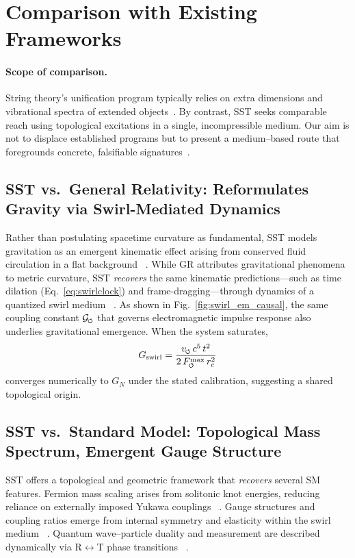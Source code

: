 \documentclass[10pt,reprint,aps,onecolumn,nofootinbib]{revtex4-2}
\newcommand{\Fmaxswirl}{F^{\max}_{\mkern-1mu\scriptscriptstyle\boldsymbol{\circlearrowleft}}}
\begin{document}
\section{Comparison with Existing Frameworks}\label{sec:comparison}

    \paragraph*{Scope of comparison.}
        String theory’s unification program typically relies on extra dimensions and vibrational spectra of extended objects~\cite{Susskind2003}. By contrast, SST seeks comparable reach using topological excitations in a single, incompressible medium. Our aim is not to displace established programs but to present a medium–based route that foregrounds concrete, falsifiable signatures~\cite{Hossenfelder2018}.

    \subsection*{SST vs.\ General Relativity: Reformulates Gravity via Swirl-Mediated Dynamics}
        Rather than postulating spacetime curvature as fundamental, SST models gravitation as an emergent kinematic effect arising from conserved fluid circulation in a flat background~ \cite{chiralSwirl}. While GR attributes gravitational phenomena to metric curvature, SST \emph{recovers} the same kinematic predictions—such as time dilation (Eq.~\ref{eq:swirlclock}) and frame-dragging—through dynamics of a quantized swirl medium~ \cite{sstCanon}. As shown in Fig.~\ref{fig:swirl_em_causal}, the same coupling constant \(\mathcal{G}_{\mkern-2mu\scriptscriptstyle\boldsymbol{\circlearrowleft}}\) that governs electromagnetic impulse response also underlies gravitational emergence. When the system saturates,
        \[
            G_{\mathrm{swirl}} = \frac{v_{\mkern-2mu\scriptscriptstyle\boldsymbol{\circlearrowleft}} \, c^5 \, t^2}{2 \, \Fmaxswirl \, r_c^2}
        \]
        converges numerically to \(G_N\) under the stated calibration, suggesting a shared topological origin.

    \subsection*{SST vs.\ Standard Model: Topological Mass Spectrum, Emergent Gauge Structure}
        SST offers a topological and geometric framework that \emph{recovers} several SM features. Fermion mass scaling arises from solitonic knot energies, reducing reliance on externally imposed Yukawa couplings~ \cite{sstLagrangian}. Gauge structures and coupling ratios emerge from internal symmetry and elasticity within the swirl medium~ \cite{sstLagrangian}. Quantum wave–particle duality and measurement are described dynamically via R$\leftrightarrow$T phase transitions~ \cite{sstCanon}.
\end{document}
